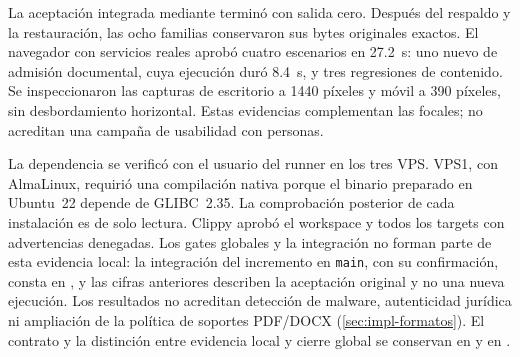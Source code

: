 La aceptación integrada mediante  terminó con
salida cero. Después del respaldo y la restauración, las ocho familias
conservaron sus bytes originales exactos. El navegador con servicios reales
aprobó cuatro escenarios en 27.2~s: uno nuevo de admisión documental, cuya
ejecución duró 8.4~s, y tres regresiones de contenido. Se inspeccionaron las
capturas de escritorio a 1440 píxeles y móvil a 390 píxeles, sin desbordamiento
horizontal. Estas evidencias complementan las focales; no acreditan una
campaña de usabilidad con personas.

La dependencia se verificó con el usuario del runner en los tres VPS. VPS1,
con AlmaLinux, requirió una compilación nativa porque el binario preparado en
Ubuntu~22 depende de GLIBC~2.35. La comprobación posterior de cada instalación
es de solo lectura. Clippy aprobó el workspace y todos los targets con
advertencias denegadas. Los gates globales y la integración no forman parte de
esta evidencia local: la integración del incremento en \texttt{main}, con su
confirmación, consta en , y las cifras
anteriores describen la aceptación original y no una nueva ejecución. Los
resultados no acreditan detección de malware, autenticidad jurídica ni
ampliación de la política de soportes PDF/DOCX (\cref{sec:impl-formatos}). El contrato y la
distinción entre evidencia local y cierre global se conservan en
 y en
.
